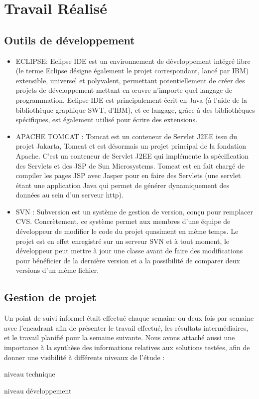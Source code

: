 \chapter{Travail Réalisé}
\label{TravailRealise}

\section{Outils de développement}
\begin{itemize}
\item ECLIPSE:
Eclipse IDE est un environnement de développement intégré libre (le terme Eclipse désigne également le projet correspondant, lancé par IBM) extensible, universel et polyvalent, permettant potentiellement de créer des projets de développement mettant en œuvre n'importe quel langage de  programmation. Eclipse IDE est principalement écrit en Java (à l'aide de la bibliothèque graphique SWT, d'IBM), et ce langage, grâce à des bibliothèques spécifiques, est également utilisé pour écrire des extensions.

\item APACHE TOMCAT :
Tomcat est un conteneur de Servlet J2EE issu du projet Jakarta, Tomcat et est désormais un projet principal de la fondation Apache. C’est un conteneur de Servlet J2EE qui implémente la spécification des Servlets et des JSP de Sun Microsystems. Tomcat est en fait chargé de compiler les pages JSP avec Jasper pour en faire des Servlets (une servlet étant une application Java qui permet de générer dynamiquement des données au sein d’un serveur http). 

\item SVN :
Subversion est un système de gestion de version, conçu pour remplacer CVS. Concrètement, ce système permet aux membres d’une équipe de développeur de modifier le code du projet quasiment en même temps. Le projet est en effet enregistré sur un serveur SVN et à tout moment, le développeur peut mettre à jour une classe avant de faire des modifications pour bénéficier de la dernière version et a la possibilité de comparer deux versions d'un même fichier.

\end{itemize}

\section{Gestion de projet}
Un point de suivi informel était effectué chaque semaine ou deux fois par semaine avec l'encadrant afin de présenter le travail effectué, les résultats intermédiaires, et le travail planifié pour la semaine suivante.
Nous avons attaché aussi une importance à la synthèse des informations relatives aux solutions testées, afin de donner une visibilité à différents niveaux de l'étude :
\begin{itemsize}
\item niveau technique
\item niveau développement
\end{itemsize}